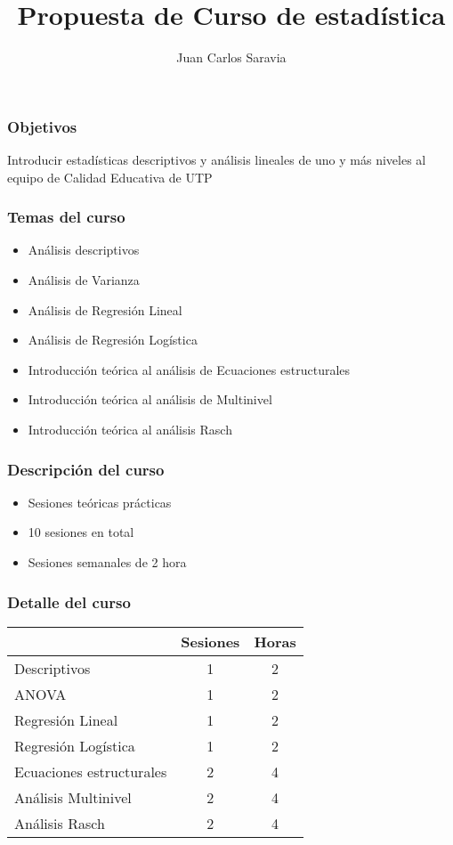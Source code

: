 \documentclass{beamer}
\title{Propuesta de Curso de estadística}
\author{Juan Carlos Saravia}
\date{}
\begin{document}
\begin{frame}
\titlepage
\end{frame}

\begin{frame}
\frametitle{Objetivos}
Introducir estadísticas descriptivos y análisis lineales de uno y más niveles al equipo de Calidad Educativa de UTP
\end{frame}

\begin{frame}
\frametitle{Temas del curso}
\begin{itemize}
\item Análisis descriptivos
\item Análisis de Varianza
\item Análisis de Regresión Lineal
\item Análisis de Regresión Logística
\item Introducción teórica al análisis de Ecuaciones estructurales
\item Introducción teórica al análisis de Multinivel
\item Introducción teórica al análisis Rasch
\end{itemize}	

\end{frame}

\begin{frame}
\frametitle{Descripción del curso}

\begin{itemize}
\item Sesiones teóricas prácticas
\item 10 sesiones en total
\item Sesiones semanales de 2 hora
\end{itemize}	
\end{frame}


\begin{frame}
\frametitle{Detalle del curso}

\begin{table}[ht]
\begin{tabular}{lcc}
\multicolumn{1}{c}{}                                         & \multicolumn{1}{l}{Sesiones} & \multicolumn{1}{l}{Horas} \\ \hline
Descriptivos                                        & 1        & 2                         \\
ANOVA                                     & 1        & 2                         \\
Regresión Lineal                                 & 1        & 2                         \\
Regresión Logística                              & 1        & 2                         \\
Ecuaciones estructurales & 2        & 4                         \\
Análisis Multinivel               & 2        & 4                         \\
Análisis Rasch                       & 2        & 4                        \\ \hline
\end{tabular}
\end{table}
\end{frame}
\end{document}
